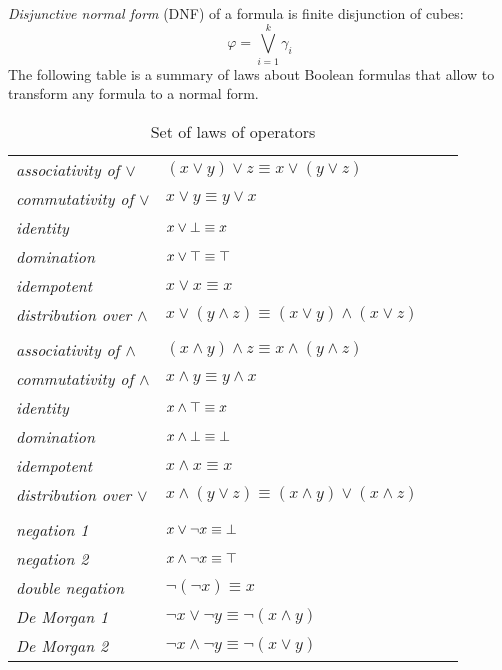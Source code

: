 \emph{Disjunctive normal form} (DNF) of a formula is finite disjunction of cubes:
  $$\varphi = \bigvee_{i=1}^k \gamma_i$$
The following table is a summary of laws about Boolean formulas that allow to transform any formula to
a normal form.
\begin{table}[!htbp]
 \centering
 \begin{tabular}{lllc}
  
  \emph{associativity of $\lor$} & $(x \lor y) \lor z \equiv x \lor (y \lor z)$\\
  \emph{commutativity of $\lor$} & $x \lor y \equiv y \lor x$\\
  \emph{identity} & $x \lor \bot \equiv x$\\
  \emph{domination} & $x \lor \top \equiv \top$\\
  \emph{idempotent} & $x \lor x \equiv x$\\
  \emph{distribution over $\land$} & $x \lor (y \land z) \equiv (x \lor y) \land (x \lor z)$\\
  
  \\
  \emph{associativity of $\land$} & $(x \land y) \land z \equiv x \land (y \land z)$\\
  \emph{commutativity of $\land$} & $x \land y \equiv y \land x$\\
  \emph{identity} & $x \land \top \equiv x$\\
  \emph{domination} & $x \land \bot \equiv \bot$\\
  \emph{idempotent} & $x \land x \equiv x$\\
  \emph{distribution over $\lor$} & $x \land (y \lor z) \equiv (x \land y) \lor (x \land z)$\\
   \\
   \emph{negation 1} & $x \lor \neg x \equiv \bot$\\
    \emph{negation 2} & $x \land \neg x \equiv \top$\\
    
    \emph{double negation} & $\neg (\neg x) \equiv x$ \\
    \emph{De Morgan 1} & $\neg x \lor \neg y \equiv \neg (x \land y)$\\
    \emph{De Morgan 2} & $\neg x \land \neg y \equiv \neg (x \lor y)$\\
    
 \end{tabular}
 \caption{Set of laws of operators}
 \label{tab:laws}
\end{table}

